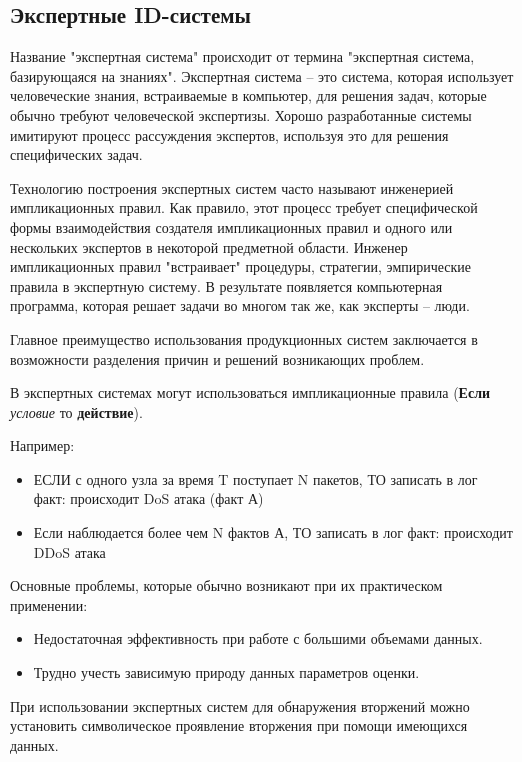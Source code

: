 \subsection{Экспертные ID-системы}

Название "экспертная система" происходит от термина "экспертная система, базирующаяся на знаниях". Экспертная система – это система, которая использует человеческие знания, встраиваемые в компьютер, для решения задач, которые обычно требуют человеческой экспертизы. Хорошо разработанные системы имитируют процесс рассуждения экспертов, используя это для решения специфических задач.

Технологию построения экспертных систем часто называют инженерией импликационных правил. Как правило,
этот процесс требует специфической формы взаимодействия создателя импликационных правил и одного
или нескольких экспертов в некоторой предметной области. Инженер импликационных правил "встраивает"
процедуры, стратегии, эмпирические правила в экспертную систему. В результате появляется
компьютерная программа, которая решает задачи во многом так же, как эксперты -- люди.
\autocite{IDSystem}

Главное преимущество использования продукционных систем заключается в возможности разделения причин и
решений возникающих проблем.

В экспертных системах могут использоваться импликационные правила (\textbf{Если} \textit{условие} то
\textbf{действие}).

Например:
\begin{itemize}
	\item ЕСЛИ с одного узла за время T поступает N пакетов, ТО записать в лог факт:
	происходит DoS атака (факт А)

	\item Если наблюдается более чем N фактов А, ТО записать в лог факт: происходит DDoS атака
\end{itemize}

Основные проблемы, которые обычно возникают при их практическом применении:
\begin{itemize}
    \item Недостаточная эффективность при работе с большими объемами данных.
    \item Трудно учесть зависимую природу данных параметров оценки.
\end{itemize}

При использовании экспертных систем для обнаружения вторжений можно установить символическое
проявление вторжения при помощи имеющихся данных.

